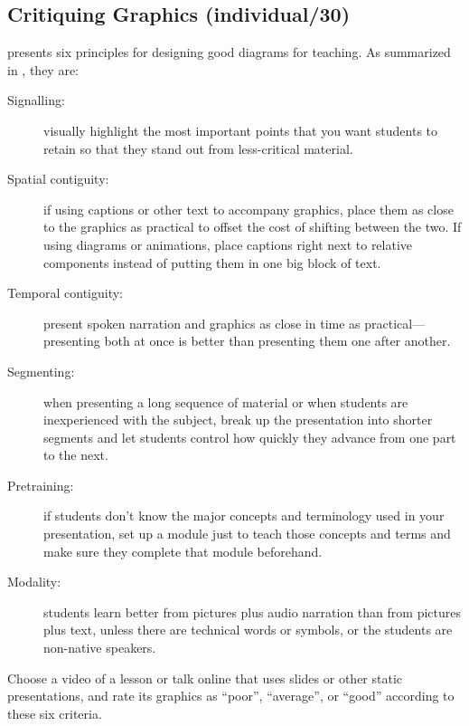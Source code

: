 \subsection*{Critiquing Graphics (individual/30)}

\cite{Maye2009} presents six principles for designing good diagrams
for teaching. As summarized in \cite{Mill2016a}, they are:

\begin{description}
\item[Signalling:]
visually highlight the most important points that you want students
to retain so that they stand out from less-critical material.
\item[Spatial contiguity:]
if using captions or other text to accompany graphics, place them as
close to the graphics as practical to offset the cost of shifting
between the two. If using diagrams or animations, place captions
right next to relative components instead of putting them in one big
block of text.
\item[Temporal contiguity:]
present spoken narration and graphics as close in time as
practical---presenting both at once is better than presenting them
one after another.
\item[Segmenting:]
when presenting a long sequence of material or when students are
inexperienced with the subject, break up the presentation into
shorter segments and let students control how quickly they advance
from one part to the next.
\item[Pretraining:]
if students don't know the major concepts and terminology used in
your presentation, set up a module just to teach those concepts and
terms and make sure they complete that module beforehand.
\item[Modality:]
students learn better from pictures plus audio narration than from
pictures plus text, unless there are technical words or symbols, or
the students are non-native speakers.
\end{description}

Choose a video of a lesson or talk online that uses slides or other
static presentations, and rate its graphics as ``poor'', ``average'', or
``good'' according to these six criteria.

